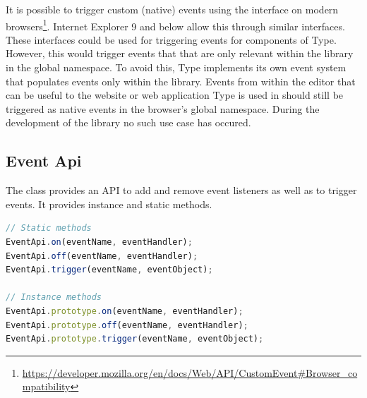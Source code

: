 It is possible to trigger custom (native) events using the  interface on modern browsers\footnote{\url{https://developer.mozilla.org/en/docs/Web/API/CustomEvent\#Browser_compatibility}}. Internet Explorer 9 and below allow this through similar interfaces. These interfaces could be used for triggering events for components of Type. However, this would trigger events that that are only relevant within the library in the global namespace. To avoid this, Type implements its own event system that populates events only within the library. Events from within the editor that can be useful to the website or web application Type is used in should still be triggered as native events in the browser's global namespace. During the development of the library no such use case has occured.



\subsection{Event Api}

The  class provides an API to add and remove event listeners as well as to trigger events. It provides instance and static methods.

\begin{lstlisting}[language=JavaScript, caption={EventApi methods}, label=lst:eventapi_methods]
// Static methods
EventApi.on(eventName, eventHandler);
EventApi.off(eventName, eventHandler);
EventApi.trigger(eventName, eventObject);

// Instance methods
EventApi.prototype.on(eventName, eventHandler);
EventApi.prototype.off(eventName, eventHandler);
EventApi.prototype.trigger(eventName, eventObject);
\end{lstlisting}


